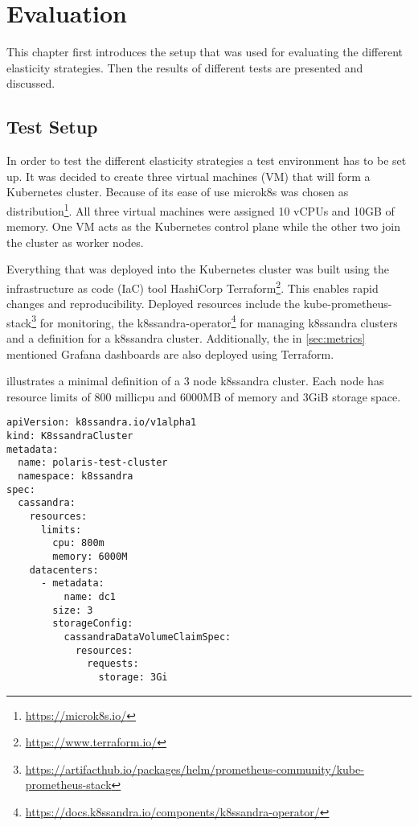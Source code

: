 \chapter{Evaluation}
\label{ch:evaluation}

This chapter first introduces the setup that was used for evaluating the different elasticity strategies. Then the results of different tests are presented and discussed.

\section{Test Setup}
\label{sec:testsetup}

In order to test the different elasticity strategies a test environment has to be set up. It was decided to create three virtual machines (VM) that will form a Kubernetes cluster. Because of its ease of use microk8s was chosen as distribution\footnote{\url{https://microk8s.io/}}. All three virtual machines were assigned 10 vCPUs and 10GB of memory. One VM acts as the Kubernetes control plane while the other two join the cluster as worker nodes.

Everything that was deployed into the Kubernetes cluster was built using the infrastructure as code (IaC) tool HashiCorp Terraform\footnote{\url{https://www.terraform.io/}}. This enables rapid changes and reproducibility. Deployed resources include the kube-prometheus-stack\footnote{\raggedright\url{https://artifacthub.io/packages/helm/prometheus-community/kube-prometheus-stack}} for monitoring, the k8ssandra-operator\footnote{\url{https://docs.k8ssandra.io/components/k8ssandra-operator/}} for managing k8ssandra clusters and a definition for a k8ssandra cluster. Additionally, the in \cref{sec:metrics} mentioned Grafana dashboards are also deployed using Terraform.

 illustrates a minimal definition of a 3 node k8ssandra cluster. Each node has resource limits of 800 millicpu and 6000MB of memory and 3GiB storage space.

\begin{lstlisting}[caption={Minimal example of a K8ssandraCluster definition.},
                label=lst:k8c,
                captionpos=b,
                float]
apiVersion: k8ssandra.io/v1alpha1
kind: K8ssandraCluster
metadata:
  name: polaris-test-cluster
  namespace: k8ssandra
spec:
  cassandra:
    resources:
      limits:
        cpu: 800m
        memory: 6000M
    datacenters:
      - metadata:
          name: dc1
        size: 3
        storageConfig:
          cassandraDataVolumeClaimSpec:
            resources:
              requests:
                storage: 3Gi
\end{lstlisting}

